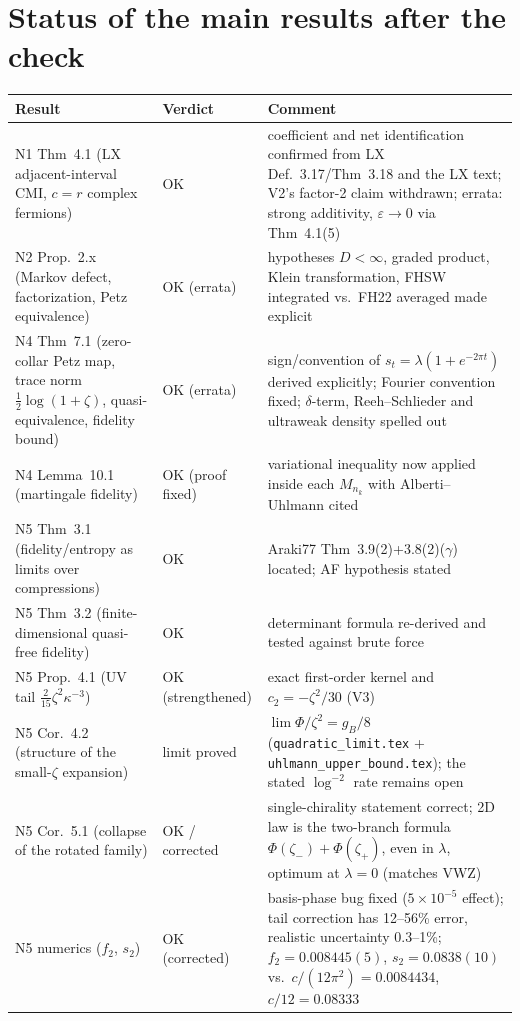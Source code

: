 \section{Status of the main results after the check}
\begin{small}
\begin{tabular}{p{}p{}p{}}
\hline
Result & Verdict & Comment \\ \hline
N1 Thm~4.1 (LX adjacent-interval CMI, $c=r$ complex fermions) & OK & coefficient and net identification confirmed from LX Def.~3.17/Thm~3.18 and the LX text; V2's factor-2 claim withdrawn; errata: strong additivity, $\varepsilon\to0$ via Thm~4.1(5) \\
N2 Prop.~2.x (Markov defect, factorization, Petz equivalence) & OK (errata) & hypotheses $D<\infty$, graded product, Klein transformation, FHSW integrated vs.\ FH22 averaged made explicit \\
N4 Thm~7.1 (zero-collar Petz map, trace norm $\tfrac12\log(1+\zeta)$, quasi-equivalence, fidelity bound) & OK (errata) & sign/convention of $s_t=\lambda(1+e^{-2\pi t})$ derived explicitly; Fourier convention fixed; $\delta$-term, Reeh--Schlieder and ultraweak density spelled out \\
N4 Lemma~10.1 (martingale fidelity) & OK (proof fixed) & variational inequality now applied inside each $M_{n_k}$ with Alberti--Uhlmann cited \\
N5 Thm~3.1 (fidelity/entropy as limits over compressions) & OK & Araki77 Thm~3.9(2)+3.8(2)($\gamma$) located; AF hypothesis stated \\
N5 Thm~3.2 (finite-dimensional quasi-free fidelity) & OK & determinant formula re-derived and tested against brute force \\
N5 Prop.~4.1 (UV tail $\tfrac2{15}\zeta^2\kappa^{-3}$) & OK (strengthened) & exact first-order kernel and $c_2=-\zeta^2/30$ (V3) \\
N5 Cor.~4.2 (structure of the small-$\zeta$ expansion) & limit proved & $\lim\Phi/\zeta^2=g_B/8$ (\texttt{quadratic\_limit.tex} + \texttt{uhlmann\_upper\_bound.tex}); the stated $\log^{-2}$ rate remains open \\
N5 Cor.~5.1 (collapse of the rotated family) & OK / corrected & single-chirality statement correct; 2D law is the two-branch formula $\Phi(\zeta_-)+\Phi(\zeta_+)$, even in $\lambda$, optimum at $\lambda=0$ (matches VWZ) \\
N5 numerics ($f_2$, $s_2$) & OK (corrected) & basis-phase bug fixed ($5\times10^{-5}$ effect); tail correction has 12--56\% error, realistic uncertainty 0.3--1\%; $f_2=0.008445(5)$, $s_2=0.0838(10)$ vs.\ $c/(12\pi^2)=0.0084434$, $c/12=0.08333$ \\

\end{tabular}
\end{small}
